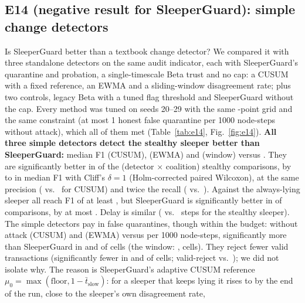 \subsection{E14 (negative result for SleeperGuard): simple change detectors}
Is SleeperGuard better than a textbook change detector? We compared it with three standalone detectors on the same
audit indicator, each with SleeperGuard's quarantine and probation, a single-timescale Beta trust and no cap: a
CUSUM with a fixed reference, an EWMA and a sliding-window disagreement rate; plus two controls, legacy Beta with a
tuned flag threshold and SleeperGuard without the cap. Every method was tuned on seeds 20--29 with the same
\EfourteenGridBudget{}-point grid and the same constraint (at most 1 honest false quarantine per 1000 node-steps
without attack), which all of them met (Table~\ref{tab:e14}, Fig.~\ref{fig:e14}).
\textbf{All three simple detectors detect the stealthy sleeper better than SleeperGuard:} median F1
\EfourteenCuStealthFOne{} (CUSUM), \EfourteenEwStealthFOne{} (EWMA) and \EfourteenWiStealthFOne{} (window) versus
\EfourteenSgStealthFOne{}. They are significantly better in \EfourteenStealthBetterAll{} of the
\EfourteenStealthTests{} (detector $\times$ coalition) stealthy comparisons, by \EfourteenStealthGainMin{} to
\EfourteenStealthGainMax{} in median F1 with Cliff's $\delta=1$ (Holm-corrected paired Wilcoxon), at the same precision
(\EfourteenCuStealthPrec{} vs.\ \EfourteenSgStealthPrec{} for CUSUM) and twice the recall (\EfourteenCuStealthRec{} vs.\
\EfourteenSgStealthRec{}). Against the always-lying sleeper all reach F1 of at least \EfourteenEwLieFOne{}, but
SleeperGuard is significantly better in \EfourteenLieWorse{} of \EfourteenLieTests{} comparisons, by at most
\EfourteenLieLossMax{}. Delay is similar (\EfourteenCuDelay{} vs.\ \EfourteenSgDelay{} steps for the stealthy sleeper).
The simple detectors pay in false quarantines, though within the budget: without attack \EfourteenCuFq{} (CUSUM) and
\EfourteenEwFq{} (EWMA) versus \EfourteenSgFq{} per 1000 node-steps, significantly more than SleeperGuard in
\EfourteenCuFqWorseSg{} and \EfourteenEwFqWorseSg{} of \EfourteenCuFqTests{} cells (the window: \EfourteenWiFq{},
\EfourteenWiFqWorseSg{} cells). They reject fewer valid transactions (significantly fewer in \EfourteenCuVrBetterSg{} and
\EfourteenEwVrBetterSg{} of \EfourteenCells{} cells; valid-reject \EfourteenCuVr{} vs.\ \EfourteenSgVr{}); we did not
isolate why.
The reason is SleeperGuard's adaptive CUSUM reference $\mu_0=\max(\text{floor},1-\bar t_{\text{slow}})$: for a sleeper
that keeps lying it rises to \EfourteenMechSgMu{} by the end of the run, close to the sleeper's own disagreement rate,
